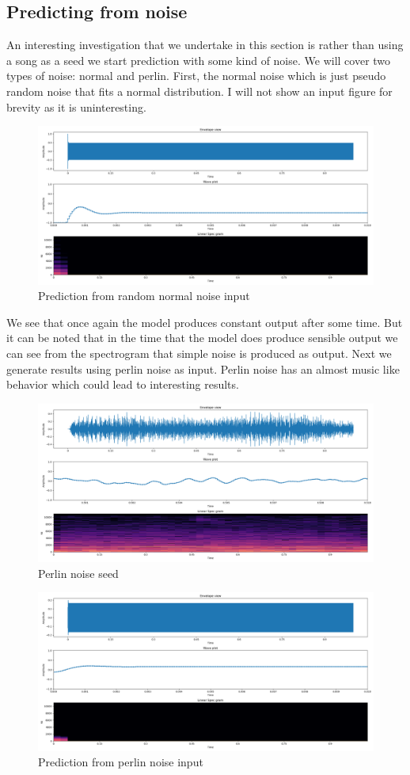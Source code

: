 \documentclass{article}
\begin{document}
\subsection{Predicting from noise}
An interesting investigation that we undertake in this section is rather than using a song as a seed we start prediction with some kind of noise. We will cover two types of noise: normal and perlin. First, the normal noise which is just pseudo random noise that fits a normal distribution. I will not show an input figure for brevity as it is uninteresting. 
\begin{figure}[H]
\caption{Prediction from random normal noise input}
\includegraphics[scale=0.35]{random_normal_prediction.png}
\end{figure}
We see that once again the model produces constant output after some time. But it can be noted that in the time that the model does produce sensible output we can see from the spectrogram that simple noise is produced as output. 
Next we generate results using perlin noise as input. Perlin noise has an almost music like behavior which could lead to interesting results. 
\begin{figure}[H]
\caption{Perlin noise seed}
\includegraphics[scale=0.35]{perlin_seed.png}
\end{figure}
\begin{figure}[H]
\caption{Prediction from perlin noise input}
\includegraphics[scale=0.35]{perlin_prediction.png}
\end{figure}
\end{document}
